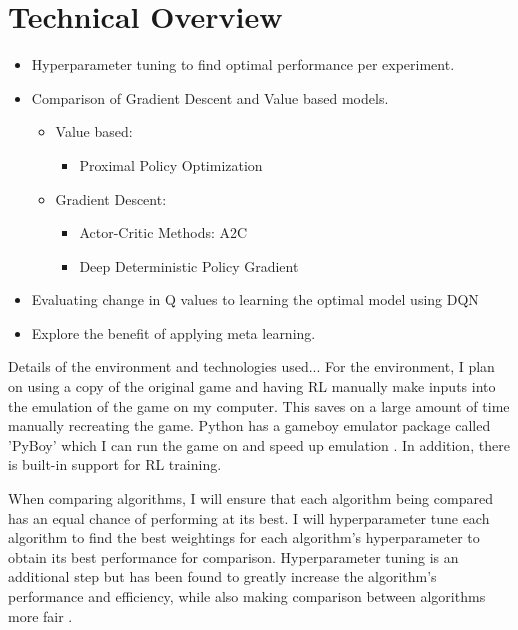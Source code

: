 \documentclass{surrey_disso_style}
\begin{document}
\section{Technical Overview}

\begin{itemize}
   \item Hyperparameter tuning to find optimal performance per experiment.
   \item Comparison of Gradient Descent and Value based models.
   \begin{itemize}
      \item Value based:
         \begin{itemize}
            \item Proximal Policy Optimization
         \end{itemize}
      \item Gradient Descent:
         \begin{itemize}
            \item Actor-Critic Methods: A2C 
            \item Deep Deterministic Policy Gradient
         \end{itemize}
   \end{itemize}
   \item Evaluating change in Q values to learning the optimal model using DQN
   \item Explore the benefit of applying meta learning.
\end{itemize}

Details of the environment and technologies used... 
For the environment, I plan on using a copy of the original game and having RL manually make inputs into the emulation of the game 
on my computer. This saves on a large amount of time manually recreating the game. Python has a gameboy emulator package called 'PyBoy'
which I can run the game on and speed up emulation \cite{pyboy}. In addition, there is built-in support for RL training.


When comparing algorithms, I will ensure that each algorithm being compared has an equal chance of performing at its best. I will 
hyperparameter tune each algorithm to find the best weightings for each algorithm's hyperparameter to obtain its best performance 
for comparison. Hyperparameter tuning is an additional step but has been found to greatly increase the algorithm's performance and 
efficiency, while also making comparison between algorithms more fair \cite{zhang2021importance}.
\par
\end{document}
